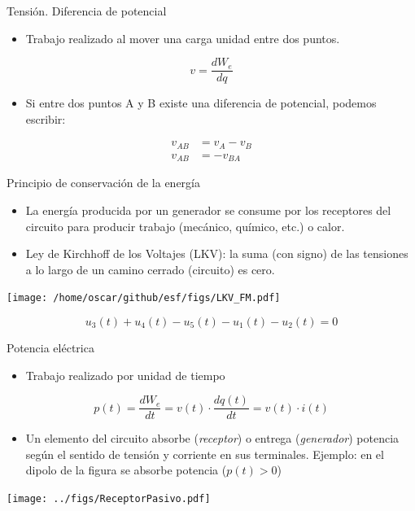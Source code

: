 \documentclass[xcolor={usenames,svgnames,dvipsnames}]{beamer}
\begin{document}
\begin{frame}[label={sec:org5eb540f}]{Tensión. Diferencia de potencial}
\begin{itemize}
\item \alert{Trabajo realizado al mover una carga unidad entre dos puntos}.
\end{itemize}

\[
v=\frac{dW_{e}}{dq}
\]

\begin{itemize}
\item Si entre dos puntos A y B existe una diferencia de potencial, podemos
escribir:
\end{itemize}
\begin{align*}
         v_{AB} &=  v_{A}-v_{B}\\
         v_{AB} &=  -v_{BA}
\end{align*}
\end{frame}

\begin{frame}[label={sec:org6abbb3d}]{Principio de conservación de la energía}
\begin{itemize}
\item La energía producida por un generador se consume por los receptores
del circuito para producir trabajo (mecánico, químico, etc.) o
calor.

\item \alert{Ley de Kirchhoff de los Voltajes (LKV)}: la suma (con signo) de las
tensiones a lo largo de un camino cerrado (circuito) es cero.
\end{itemize}

\begin{center}
\texttt{[image: /home/oscar/github/esf/figs/LKV\_FM.pdf]}
\end{center}

\[
u_3(t) + u_4 (t) - u_5 (t) - u_1 (t) - u_2 (t)  = 0
\]
\end{frame}

\begin{frame}[label={sec:org95b70a2}]{Potencia eléctrica}
\begin{itemize}
\item Trabajo realizado por unidad de tiempo
\end{itemize}
\[
p(t)=\frac{dW_{e}}{dt}=v(t)\cdot\frac{dq(t)}{dt}=v(t)\cdot i(t)
\]

\begin{itemize}
\item Un elemento del circuito absorbe (\emph{receptor}) o entrega
(\emph{generador}) potencia según el sentido de tensión y corriente en
sus terminales. Ejemplo: en el dipolo de la figura se absorbe
potencia (\(p(t)>0\))
\end{itemize}
\begin{center}
\texttt{[image: ../figs/ReceptorPasivo.pdf]}
\end{center}
\end{frame}
\end{document}
